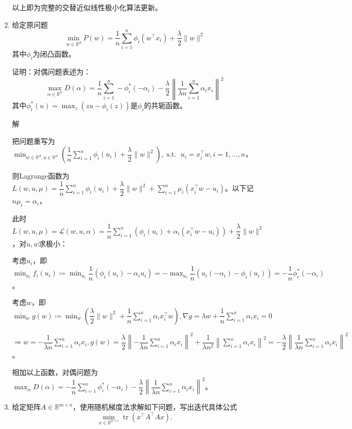 \documentclass[cn,hazy,cyan,11pt,normal]{elegantnote}
\DeclareMathOperator*{\tr}{tr}
\DeclareMathOperator*{\st}{s.t.\,\,}
\begin{document}
\begin{enumerate}
{            以上即为完整的交替近似线性极小化算法更新。\vspace{0.5cm}}

        \item {{\color{c1}给定原问题\[\min_{w\in\mathbb{R}^d}P(w)=\dfrac1n\sum_{i=1}^n \phi_i(w^{\top}x_i)+\dfrac{\lambda}2\|w\|^2\]其中$\phi_i$为闭凸函数。

            证明：对偶问题表述为：\[\max_{\alpha\in\mathbb{R}^n}D(\alpha)=\dfrac1n\sum_{i=1}^n -\phi_i^{*}(-\alpha_i)-\dfrac{\lambda}{2}\left\|\dfrac1{\lambda n}\sum_{i=1}^n \alpha_i x_i \right\|^2\]其中$\phi_i^{*}(u)=\max_z(zu-\phi_i(z))$是$\phi_i$的共轭函数。}

            \vspace{0.5cm}\textcolor{c2}{解}

            把问题重写为$\min_{w\in\mathbb{R}^d,u\in\mathbb{R}^n}\left( \dfrac1n\sum_{i=1}^n \phi_i(u_i)+\dfrac{\lambda}2\|w\|^2 \right),\st u_i=x_i^{\top}w,i=1,\ldots, n$，

            则Lagrange函数为$L(w,u,\mu)=\dfrac1n\sum_{i=1}^n \phi_i(u_i)+\dfrac{\lambda}2\|w\|^2 +\sum_{i=1}^n \mu_i(x_i^{\top}w-u_i)$。以下记$n\mu_i=\alpha_i$，

            此时$L(w,u,\mu)=\mathcal{L}(w,u,\alpha)=\dfrac1n\sum_{i=1}^n\left(\phi_i(u_i)+\alpha_i(x_i^{\top}w-u_i)\right)+\dfrac{\lambda}2\|w\|^2$，对$u,w$求极小：

            考虑$u_i$，即$\min_{u_i}f_i(u_i)\coloneqq\min_{u_i}\dfrac1n\left(\phi_i(u_i)-\alpha_i u_i \right)=-\max_{u_i}\dfrac1n\left(u_i(-\alpha_i)-\phi_i(u_i)\right)=-\dfrac1n \phi_i^{*}(-\alpha_i)$。

            考虑$w$，即$\min_{w}g(w)\coloneqq \min_w \left(\dfrac{\lambda}2\|w\|^2+\dfrac1n\sum_{i=1}^n \alpha_{i}x_i^{\top}w\right),\nabla g=\lambda w+\dfrac1n\sum_{i=1}^n \alpha_{i}x_i=0$

            $\Rightarrow w=-\dfrac1{\lambda n}\sum_{i=1}^n \alpha_{i}x_i,g(w)=\dfrac{\lambda}2\left\|-\dfrac1{\lambda n}\sum_{i=1}^n \alpha_{i}x_i\right\|^2+\dfrac1{\lambda n^2}\left\| \sum_{i=1}^n \alpha_{i}x_i \right\|^2=-\dfrac{\lambda}{2}\left\|\dfrac1{\lambda n}\sum_{i=1}^n \alpha_i x_i \right\|^2$。

            相加以上函数，对偶问题为$\max_{\alpha}D(\alpha)=-\dfrac1n\sum_{i=1}^n \phi_i^{*}(-\alpha_i)-\dfrac{\lambda}{2}\left\|\dfrac1{\lambda n}\sum_{i=1}^n \alpha_i x_i \right\|^2$。\vspace{0.5cm}
            }

        \item {{\color{c1}给定矩阵$A\in\mathbb{R}^{m\times n}$，使用随机梯度法求解如下问题，写出迭代具体公式\[\min_{x\in\mathbb{R}^{n\times r}} \tr(x^{\top}A^{\top}Ax).\] }

}
\end{enumerate}
\end{document}
